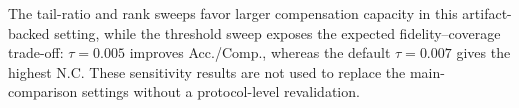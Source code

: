 \documentclass[journal]{Tail_Aware_Post_Training_Quantization_for_3D_Geometry_Models_TMM/IEEEtran}
\begin{document}
The tail-ratio and rank sweeps favor larger compensation capacity in this artifact-backed setting, while the threshold sweep exposes the expected fidelity--coverage trade-off: $\tau=0.005$ improves Acc./Comp., whereas the default $\tau=0.007$ gives the highest N.C. These sensitivity results are not used to replace the main-comparison settings without a protocol-level revalidation.
\end{document}
